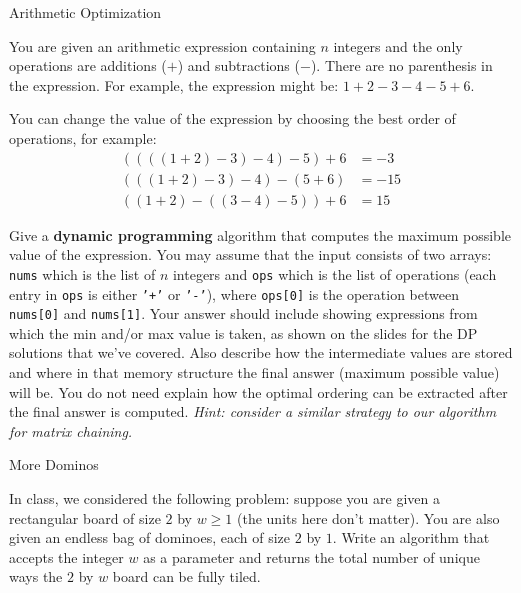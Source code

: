 \documentclass[10pt]{article}
\begin{document}
\thispagestyle{empty}
\handout


\begin{problem}Arithmetic Optimization\end{problem}
\noindent You are given an arithmetic expression containing $n$ integers and the only operations are additions ($+$) and subtractions ($-$). There are no parenthesis in the expression. For example, the expression might be: $1 + 2 - 3 - 4 - 5 + 6$.

You can change the value of the expression by choosing the best order of operations, for example:
\begin{align*}
 ((((1 + 2) - 3) - 4) - 5) + 6 &= -3 \\
 (((1 + 2) - 3) - 4) - (5 + 6) &= -15\\
 ((1 + 2) - ((3 - 4) - 5)) + 6 &= 15
\end{align*}

Give a {\bf dynamic programming} algorithm that computes the maximum possible value of the expression. You may assume that
the input consists of two arrays: \texttt{nums} which is the list of $n$ integers and \texttt{ops} which is the list of operations (each entry in \texttt{ops} is either \texttt{'+'} or \texttt{'-'}), where \texttt{ops[0]} is the operation between \texttt{nums[0]} and \texttt{nums[1]}. Your answer should include showing expressions from which the min and/or max value is taken, as shown on the slides for the DP solutions that we've covered. Also describe how the intermediate values are stored and where in that memory structure the final answer (maximum possible value) will be. You do not need explain how the optimal ordering can be extracted after the final answer is computed.   \emph{Hint: consider a similar strategy to our algorithm for matrix chaining.}

\solution{
}

  

\begin{problem} More Dominos \end{problem}

In class, we considered the following problem: suppose you are given a rectangular board of size $2$ by $w \geq 1$ (the units here don't matter). You are also given an endless bag of dominoes, each of size $2$ by $1$. Write an algorithm that accepts the integer $w$ as a parameter and returns the total number of unique ways the $2$ by $w$ board can be fully tiled.
\end{document}
